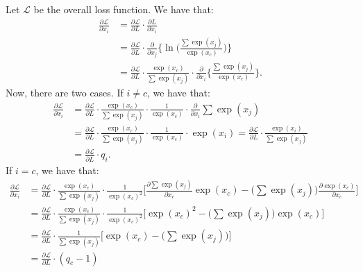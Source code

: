\documentclass[10pt]{article}
\begin{document}
  Let $\mathcal{L}$ be the overall loss function. We have that:
  \begin{align*}
  	\frac{\partial \mathcal{L}}{\partial x_i}
  	&= \frac{\partial \mathcal{L}}{\partial L} \cdot \frac{\partial L}{\partial x_i} \\
  	&= \frac{\partial \mathcal{L}}{\partial L} \cdot \frac{\partial}{\partial x_j} \bigg\{ \ln \bigg( \frac{\sum \exp(x_j)}{\exp(x_c)} \bigg) \bigg\} \\
  	&= \frac{\partial \mathcal{L}}{\partial L} \cdot \frac{\exp(x_c)}{\sum \exp(x_j)} \cdot \frac{\partial}{\partial x_i} \bigg\{ \frac{\sum \exp(x_j)}{\exp(x_c)} \bigg\}.
  \end{align*}
  Now, there are two cases. If $i \neq c$, we have that:
  \begin{align*}
  	\frac{\partial \mathcal{L}}{\partial x_i}
  	&= \frac{\partial \mathcal{L}}{\partial L} \cdot \frac{\exp(x_c)}{\sum \exp(x_j)} \cdot \frac{1}{\exp(x_c)} \cdot \frac{\partial}{\partial x_i} \sum \exp(x_j) \\
  	&= \frac{\partial \mathcal{L}}{\partial L} \cdot \frac{\exp(x_c)}{\sum \exp(x_j)} \cdot \frac{1}{\exp(x_c)} \cdot \exp(x_i) 
  	= \frac{\partial \mathcal{L}}{\partial L} \cdot \frac{\exp(x_i)}{\sum \exp(x_j)} \\
  	&= \frac{\partial \mathcal{L}}{\partial L} \cdot q_i.
  \end{align*}
  If $i = c$, we have that:
  \begin{align*}
  	\frac{\partial \mathcal{L}}{\partial x_i}
  	&= \frac{\partial \mathcal{L}}{\partial L} \cdot \frac{\exp(x_c)}{\sum \exp(x_j)} \cdot \frac{1}{\exp(x_c)^2} \bigg[ \frac{\partial \sum \exp(x_j)}{\partial x_c} \exp(x_c) - \big( \sum \exp(x_j) \big) \frac{\partial \exp(x_c)}{\partial x_c} \bigg] \\
  	&= \frac{\partial \mathcal{L}}{\partial L} \cdot \frac{\exp(x_c)}{\sum \exp(x_j)} \cdot \frac{1}{\exp(x_c)^2} \bigg[ \exp(x_c)^2 - \big( \sum \exp(x_j) \big) \exp(x_c) \bigg] \\
  	&= \frac{\partial \mathcal{L}}{\partial L} \cdot \frac{1}{\sum \exp(x_j)} \bigg[ \exp(x_c) - \big( \sum \exp(x_j) \big) \bigg] \\
  	&= \frac{\partial \mathcal{L}}{\partial L} \cdot (q_c - 1)
  \end{align*}

  
    
\end{document}
